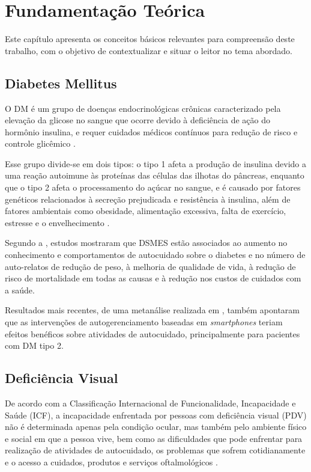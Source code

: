 \chapter{Fundamentação Teórica}
\label{ch:fundament}

Este capítulo apresenta os conceitos básicos relevantes para compreensão deste trabalho,
com o objetivo de contextualizar e situar o leitor no tema abordado.

\section{Diabetes Mellitus}

O DM é um grupo de doenças endocrinológicas crônicas
caracterizado pela elevação da glicose no sangue que ocorre devido à deficiência de ação do hormônio insulina, e requer cuidados médicos
contínuos para redução de risco e controle glicêmico \cite{ADA2019}.

Esse grupo divide-se em dois tipos: o tipo 1 afeta a produção de insulina devido a uma reação autoimune às proteínas das células das
ilhotas do pâncreas, enquanto que o tipo 2 afeta o processamento do açúcar no sangue, e é causado por fatores genéticos relacionados
à secreção prejudicada e resistência à insulina, além de fatores ambientais
como obesidade, alimentação excessiva, falta de exercício,
estresse e o envelhecimento \cite{Ozougwu_2013}.

Segundo a , estudos mostraram que DSMES estão associados ao aumento no conhecimento e comportamentos de
autocuidado sobre o diabetes e no número de auto-relatos de redução de peso, à melhoria de qualidade de vida, à redução de risco de mortalidade
em todas as causas e à redução nos custos de cuidados com a saúde.

Resultados mais recentes, de uma metanálise realizada em , também apontaram que as intervenções
de autogerenciamento baseadas em \emph{smartphones} teriam efeitos benéficos sobre atividades de autocuidado, principalmente para
pacientes com DM tipo 2.

\section{Deficiência Visual}

De acordo com a Classificação Internacional de Funcionalidade, Incapacidade e Saúde (ICF),
a incapacidade enfrentada por pessoas com deficiência visual (PDV) não é determinada apenas
pela condição ocular, mas também pelo ambiente físico e social em que a pessoa vive, bem como
as dificuldades que pode enfrentar para realização de atividades de autocuidado, os problemas
que sofrem cotidianamente e o acesso a cuidados, produtos e serviços oftalmológicos \cite{WHO2019}.

